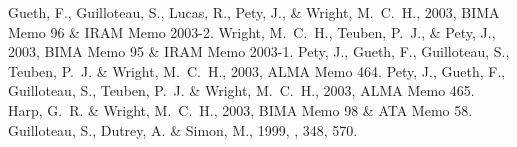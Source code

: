 \documentclass[11pt,twoside]{article}  %
\newcommand{\ALMA}{\textrm{ALMA}}
\begin{document}
%
\begin{references}
 Gueth, F., Guilloteau, S., Lucas, R., Pety, J., \&
    Wright, M.~C.~H., 2003, BIMA Memo 96 \& IRAM Memo 2003-2.
 Wright, M.~C.~H., Teuben, P.~J., \& Pety, J., 2003,
     BIMA Memo 95 \& IRAM Memo 2003-1.
 Pety, J., Gueth, F., Guilloteau, S., Teuben, P.~J. \&
    Wright, M.~C.~H., 2003, \ALMA{} Memo 464.
 Pety, J., Gueth, F., Guilloteau, S., Teuben, P.~J. \&
    Wright, M.~C.~H., 2003, \ALMA{} Memo 465.
 Harp, G.~R. \& Wright, M.~C.~H., 2003, BIMA Memo 98 \& 
    ATA Memo 58.
 Guilloteau, S., Dutrey, A. \& Simon, M., 1999, \aap, 348, 570.
\end{references}

\end{document}
